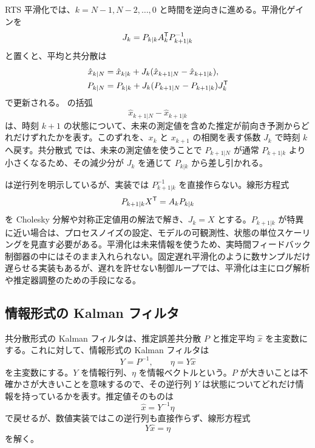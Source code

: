 RTS 平滑化では、$k=N-1,N-2,\ldots,0$ と時間を逆向きに進める。平滑化ゲインを
\begin{equation}
  J_k=P_{k|k}A_k^{\mathsf{T}} P_{k+1|k}^{-1}
  \label{eq:rts-smoother-gain}
\end{equation}
と置くと、平均と共分散は
\begin{align}
  \hat{x}_{k|N}
  &=
  \hat{x}_{k|k}
  +J_k(\hat{x}_{k+1|N}-\hat{x}_{k+1|k}),
  \label{eq:rts-smoother-mean}\\
  P_{k|N}
  &=
  P_{k|k}
  +J_k(P_{k+1|N}-P_{k+1|k})J_k^{\mathsf{T}}
  \label{eq:rts-smoother-covariance}
\end{align}
で更新される。 の括弧
\begin{equation}
  \hat{x}_{k+1|N}-\hat{x}_{k+1|k}
\end{equation}
は、時刻 $k+1$ の状態について、未来の測定値を含めた推定が前向き予測からどれだけずれたかを表す。このずれを、$x_k$ と $x_{k+1}$ の相関を表す係数 $J_k$ で時刻 $k$ へ戻す。共分散式  では、未来の測定値を使うことで $P_{k+1|N}$ が通常 $P_{k+1|k}$ より小さくなるため、その減少分が $J_k$ を通じて $P_{k|k}$ から差し引かれる。

 は逆行列を明示しているが、実装では $P_{k+1|k}^{-1}$ を直接作らない。線形方程式
\begin{equation}
  P_{k+1|k}X^{\mathsf{T}}=A_kP_{k|k}
\end{equation}
を Cholesky 分解や対称正定値用の解法で解き、$J_k=X$ とする。$P_{k+1|k}$ が特異に近い場合は、プロセスノイズの設定、モデルの可観測性、状態の単位スケーリングを見直す必要がある。平滑化は未来情報を使うため、実時間フィードバック制御器の中にはそのまま入れられない。固定遅れ平滑化のように数サンプルだけ遅らせる実装もあるが、遅れを許せない制御ループでは、平滑化は主にログ解析や推定器調整のための手段になる。

\subsection{情報形式の Kalman フィルタ}

共分散形式の Kalman フィルタは、推定誤差共分散 $P$ と推定平均 $\hat{x}$ を主変数にする。これに対して、情報形式の Kalman フィルタは
\begin{equation}
  Y=P^{-1},
  \qquad
  \eta=Y\hat{x}
  \label{eq:information-state}
\end{equation}
を主変数にする。$Y$ を情報行列、$\eta$ を情報ベクトルという。$P$ が大きいことは不確かさが大きいことを意味するので、その逆行列 $Y$ は状態についてどれだけ情報を持っているかを表す。推定値そのものは
\begin{equation}
  \hat{x}=Y^{-1}\eta
\end{equation}
で戻せるが、数値実装ではこの逆行列も直接作らず、線形方程式
\begin{equation}
  Y\hat{x}=\eta
\end{equation}
を解く。

